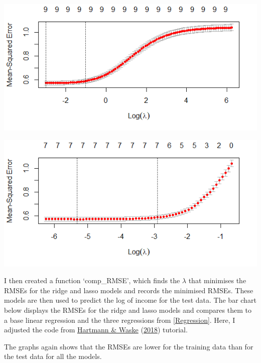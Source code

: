 \documentclass[11pt,preprint, authoryear]{elsarticle}
\let\origfigure\figure
\let\endorigfigure\endfigure
\renewenvironment{figure}[1][2] {
    \expandafter\origfigure\expandafter[H]
} {
    \endorigfigure
}
\numberwithin{equation}{section}
\numberwithin{figure}{section}
\numberwithin{table}{section}
\begin{document}
\begin{figure}
\centering
\includegraphics{"images/ridge.png"}
\caption{Ridge}
\end{figure}

\begin{figure}
\centering
\includegraphics{"images/lasso.png"}
\caption{Lasso}
\end{figure}

I then created a function `comp\_RMSE', which finds the \(\lambda\) that
minimises the RMSEs for the ridge and lasso models and records the
minimised RMSEs. These models are then used to predict the log of income
for the test data. The bar chart below displays the RMSEs for the ridge
and lasso models and compares them to a base linear regression and the
three regressions from \ref{Regression}. Here, I adjusted the code from
\protect\hyperlink{ref-ridge}{Hartmann \& Waske}
(\protect\hyperlink{ref-ridge}{2018}) tutorial.

The graphs again shows that the RMSEs are lower for the training data
than for the test data for all the models.
\end{document}
